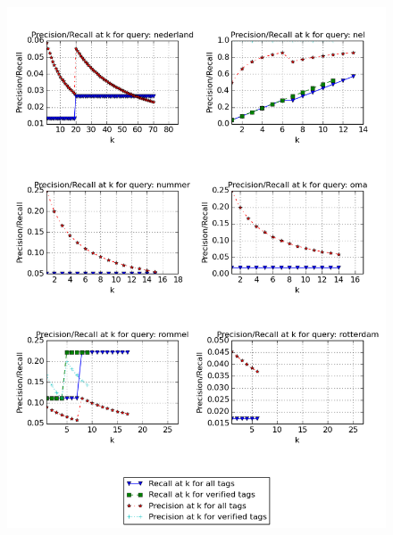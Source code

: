 \begin{figure}[H]
\centering
\includegraphics[width=\textwidth]{appendixd/queries-nederland}
\end{figure}


